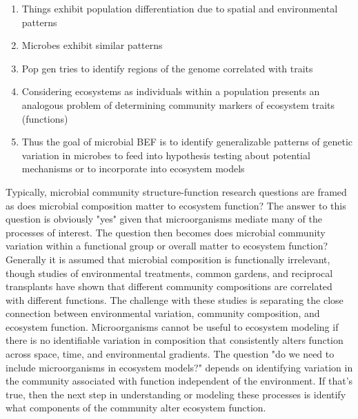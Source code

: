 \documentclass{article}
\begin{document}
\begin{enumerate}
    \item Things exhibit population differentiation due to spatial and environmental 
    patterns \citep{wright1943}
    \item Microbes exhibit similar patterns \citep{martiny2006}
    \item Pop gen tries to identify regions of the genome correlated with
    traits
    \item Considering ecosystems as individuals within a population presents
    an analogous problem of determining community markers of ecosystem traits (functions)
    \item Thus the goal of microbial BEF is to identify generalizable patterns
    of genetic variation in microbes to feed into hypothesis testing about
    potential mechanisms or to incorporate into ecosystem models
\end{enumerate}

Typically, microbial community structure-function research questions are framed
as does microbial composition matter to ecosystem function? The answer to this
question is obviously "yes" given that microorganisms mediate many of the
processes of interest. The question then becomes does microbial community
variation within a functional group or overall matter to ecosystem function? 
Generally it is assumed that microbial composition is functionally irrelevant, 
though studies of environmental treatments, common gardens, and reciprocal
transplants have shown that different community compositions are correlated with
different functions. The challenge with these studies is separating the close
connection between environmental variation, community composition, and ecosystem
function. Microorganisms cannot be useful to ecosystem modeling if there
is no identifiable variation in composition that consistently alters function
across space, time, and environmental gradients. The question "do we need to
include microorganisms in ecosystem models?" depends on identifying variation in
the community associated with function independent of the environment. If that's
true, then the next step in understanding or modeling these processes is 
identify what components of the community alter ecosystem function.
\end{document}
